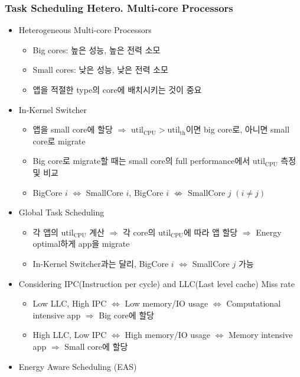 \subsubsection*{Task Scheduling Hetero. Multi-core Processors}
\begin{itemize}
    \item Heterogeneous Multi-core Processors
    \begin{itemize}
        \item Big cores: 높은 성능, 높은 전력 소모
        \item Small cores: 낮은 성능, 낮은 전력 소모
        \item 앱을 적절한 type의 core에 배치시키는 것이 중요
    \end{itemize}
    \item In-Kernel Switcher
    \begin{itemize}
        \item 앱을 small core에 할당 $\Rightarrow$ $\mathrm{util_{CPU}}>\mathrm{util_{th}}$이면 big core로, 아니면 small core로 migrate
        \item Big core로 migrate할 때는 small core의 full performance에서 $\mathrm{util_{CPU}}$ 측정 및 비교
        \item BigCore $i$ $\Leftrightarrow$ SmallCore $i$, BigCore $i$ $\nLeftrightarrow$ SmallCore $j$ $(i \neq j)$
    \end{itemize}
    \item Global Task Scheduling
    \begin{itemize}
        \item 각 앱의 $\mathrm{util_{CPU}}$ 계산 $\Rightarrow$ 각 core의 $\mathrm{util_{CPU}}$에 따라 앱 할당 $\Rightarrow$ Energy optimal하게 app을 migrate
        \item In-Kernel Switcher과는 달리, BigCore $i$ $\Leftrightarrow$ SmallCore $j$ 가능
    \end{itemize}
    \item Considering IPC(Instruction per cycle) and LLC(Last level cache) Miss rate
    \begin{itemize}
        \item Low LLC, High IPC $\Leftrightarrow$ Low memory/IO usage $\Leftrightarrow$ Computational intensive app $\Rightarrow$ Big core에 할당
        \item High LLC, Low IPC $\Leftrightarrow$ High memory/IO usage $\Leftrightarrow$ Memory intensive app $\Rightarrow$ Small core에 할당
    \end{itemize}
    \item Energy Aware Scheduling (EAS)

\end{itemize}
